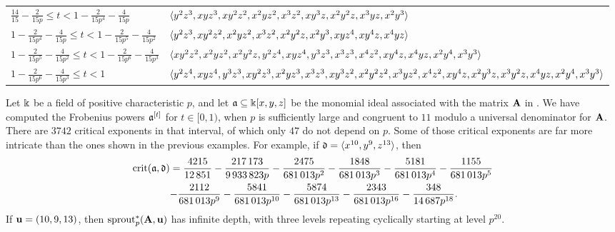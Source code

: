 \documentclass{article}
\begin{document}
\begin{example}
{\begin{landscape}
\begin{tabular}{ll}
        $\frac{14}{15}-\frac{2}{15 p}\leq t<1-\frac{2}{15p^4}-\frac{4}{15 p}$
        & $\langle y^2 z^3,x y z^3,x y^2 z^2,x^2 y z^2,x^3 z^2,x y^3 z,x^2 y^2 z,x^3 y z,x^2 y^3 \rangle$ \\
        $1-\frac{2}{15 p^4}-\frac{4}{15p}\leq t<1-\frac{2}{15 p^5}-\frac{4}{15 p^2}$
        & $\langle y^2 z^3,x y^2 z^2,x^2 y z^2,x^3 z^2,x^2 y^2 z,x^2 y^3,x y z^4,x y^4 z,x^4 y z \rangle$ \\
        $1-\frac{2}{15p^5}-\frac{4}{15 p^2}\leq t<1-\frac{2}{15 p^6}-\frac{4}{15 p^3}$
        & $\langle x y^2 z^2,x^2 y z^2,x^2 y^2 z,y^2 z^4,x y z^4,y^3 z^3,x^3 z^3,x^4 z^2,x y^4z,x^4 y z,x^2 y^4,x^3 y^3 \rangle$ \\
        $1-\frac{2}{15 p^6}-\frac{4}{15 p^3}\leq t<1$
        & $\langle y^2 z^4,x y z^4,y^3 z^3,x y^2 z^3,x^2 y z^3,x^3z^3,x y^3 z^2,x^2 y^2 z^2,x^3 y z^2,x^4 z^2,x y^4 z,x^2 y^3 z,x^3 y^2 z,x^4 y z,x^2 y^4,x^3 y^3 \rangle$ \\
        \bottomrule
      \end{tabular}
      \label{table: new homogeneous example}
    \end{landscape}
    \clearpage%
}
\end{example}

\begin{example}
   \label{ex: new homogeneous example}
   Let $\Bbbk$ be a field of positive characteristic $p$, and let $\mathfrak{a} \subseteq \Bbbk[x,y,z]$ be the monomial ideal associated with the matrix $\mathbf{A}$ in .
   We have computed the Frobenius powers $\mathfrak{a}^{[t]}$ for $t \in [0,1)$, when $p$ is sufficiently large and congruent to $11$ modulo a universal denominator for $\mathbf{A}$.
   There are $\num{3742}$ critical exponents in that interval, of which only $47$ do not depend on $p$.
   Some of those critical exponents are far more intricate than the ones shown in the previous examples.
   For example, if $\mathfrak{d} = \langle x^{10},y^9,z^{13} \rangle$, then
   \begin{align*}
     \operatorname{crit}(\mathfrak{a},\mathfrak{d}) &= {\small \frac{\num{4215}}{\num{12851}}-\frac{\num{217173}}{\num{9933823}p} -\frac{\num{2475}}{\num{681013}p^2}-\frac{\num{1848}}{\num{681013}p^3}-\frac{\num{5181}}{\num{681013}p^4} -\frac{\num{1155}}{\num{681013}p^5} } \\
     & {\small - \frac{\num{2112}}{\num{681013}p^9}-\frac{\num{5841}}{\num{681013}p^{10}}  -\frac{\num{5874}}{\num{681013}p^{13}}-\frac{\num{2343}}{\num{681013}p^{16}}-\frac{\num{348}}{\num{14687}p^{18}}.}
   \end{align*}
   If $\mathbf{u} = (10,9,13)$, then $\operatorname{sprout}_p^*(\mathbf{A},\mathbf{u})$ has infinite depth, with three levels repeating cyclically starting at level $p^{20}$.
\end{example}
\end{document}

